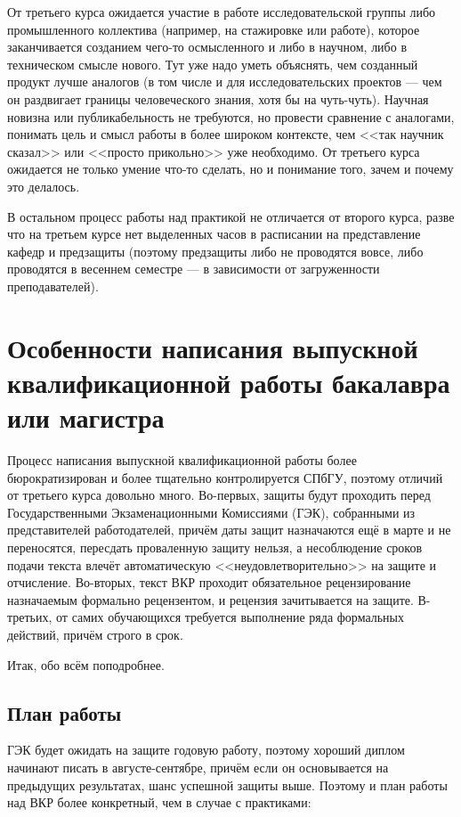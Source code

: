 \documentclass{article}
\begin{document}
От третьего курса ожидается участие в работе исследовательской группы либо промышленного коллектива (например, на стажировке или работе), которое заканчивается созданием чего-то осмысленного и либо в научном, либо в техническом смысле нового. Тут уже надо уметь объяснять, чем созданный продукт лучше аналогов (в том числе и для исследовательских проектов --- чем он раздвигает границы человеческого знания, хотя бы на чуть-чуть). Научная новизна или публикабельность не требуются, но провести сравнение с аналогами, понимать цель и смысл работы в более широком контексте, чем <<так научник сказал>> или <<просто прикольно>> уже необходимо. От третьего курса ожидается не только умение что-то сделать, но и понимание того, зачем и почему это делалось.

В остальном процесс работы над практикой не отличается от второго курса, разве что на третьем курсе нет выделенных часов в расписании на представление кафедр и предзащиты (поэтому предзащиты либо не проводятся вовсе, либо проводятся в весеннем семестре --- в зависимости от загруженности преподавателей).

\section{Особенности написания выпускной квалификационной работы бакалавра или магистра}

Процесс написания выпускной квалификационной работы более бюрократизирован и более тщательно контролируется СПбГУ, поэтому отличий от третьего курса довольно много. Во-первых, защиты будут проходить перед Государственными Экзаменационными Комиссиями (ГЭК), собранными из представителей работодателей, причём даты защит назначаются ещё в марте и не переносятся, пересдать проваленную защиту нельзя, а несоблюдение сроков подачи текста влечёт автоматическую <<неудовлетворительно>> на защите и отчисление. Во-вторых, текст ВКР проходит обязательное рецензирование назначаемым формально рецензентом, и рецензия зачитывается на защите. В-третьих, от самих обучающихся требуется выполнение ряда формальных действий, причём строго в срок. 

Итак, обо всём поподробнее.

\subsection{План работы}

ГЭК будет ожидать на защите годовую работу, поэтому хороший диплом начинают писать в августе-сентябре, причём если он основывается на предыдущих результатах, шанс успешной защиты выше. Поэтому и план работы над ВКР более конкретный, чем в случае с практиками:
\end{document}
